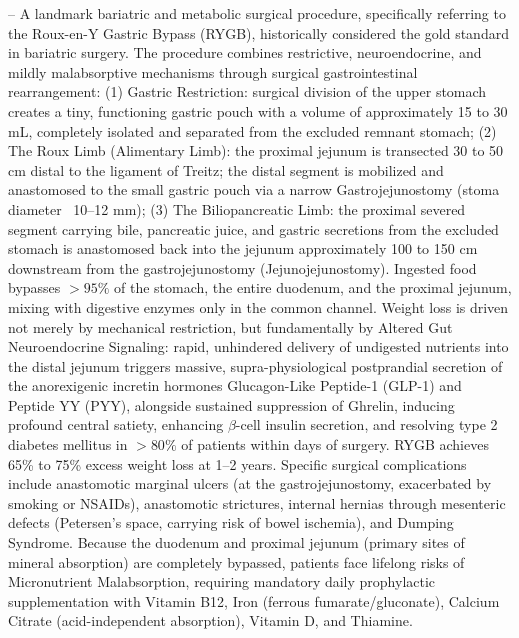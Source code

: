 -- A landmark bariatric and metabolic surgical procedure, specifically referring to the Roux-en-Y Gastric Bypass (RYGB), historically considered the gold standard in bariatric surgery. The procedure combines restrictive, neuroendocrine, and mildly malabsorptive mechanisms through surgical gastrointestinal rearrangement: (1) Gastric Restriction: surgical division of the upper stomach creates a tiny, functioning gastric pouch with a volume of approximately 15 to 30 mL, completely isolated and separated from the excluded remnant stomach; (2) The Roux Limb (Alimentary Limb): the proximal jejunum is transected 30 to 50 cm distal to the ligament of Treitz; the distal segment is mobilized and anastomosed to the small gastric pouch via a narrow Gastrojejunostomy (stoma diameter ~10--12 mm); (3) The Biliopancreatic Limb: the proximal severed segment carrying bile, pancreatic juice, and gastric secretions from the excluded stomach is anastomosed back into the jejunum approximately 100 to 150 cm downstream from the gastrojejunostomy (Jejunojejunostomy). Ingested food bypasses $>95\%$ of the stomach, the entire duodenum, and the proximal jejunum, mixing with digestive enzymes only in the common channel. Weight loss is driven not merely by mechanical restriction, but fundamentally by Altered Gut Neuroendocrine Signaling: rapid, unhindered delivery of undigested nutrients into the distal jejunum triggers massive, supra-physiological postprandial secretion of the anorexigenic incretin hormones Glucagon-Like Peptide-1 (GLP-1) and Peptide YY (PYY), alongside sustained suppression of Ghrelin, inducing profound central satiety, enhancing $\beta$-cell insulin secretion, and resolving type 2 diabetes mellitus in $>80\%$ of patients within days of surgery. RYGB achieves 65\% to 75\% excess weight loss at 1--2 years. Specific surgical complications include anastomotic marginal ulcers (at the gastrojejunostomy, exacerbated by smoking or NSAIDs), anastomotic strictures, internal hernias through mesenteric defects (Petersen's space, carrying risk of bowel ischemia), and Dumping Syndrome. Because the duodenum and proximal jejunum (primary sites of mineral absorption) are completely bypassed, patients face lifelong risks of Micronutrient Malabsorption, requiring mandatory daily prophylactic supplementation with Vitamin B12, Iron (ferrous fumarate/gluconate), Calcium Citrate (acid-independent absorption), Vitamin D, and Thiamine.

